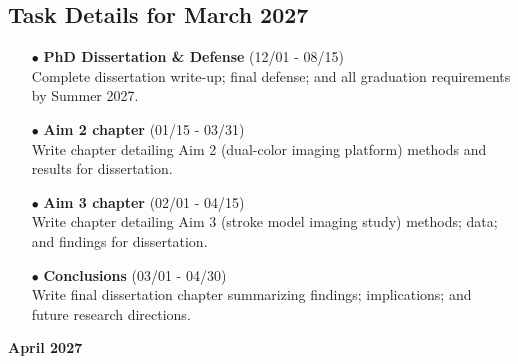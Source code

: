 \documentclass[landscape,a4paper]{article}
\begin{document}
\subsection{Task Details for March 2027}
\begin{itemize}[leftmargin=1cm]
    \item[\textcolor{other}{$\bullet$}] \textbf{PhD Dissertation \& Defense} (12/01 - 08/15)\\ Complete dissertation write-up; final defense; and all graduation requirements by Summer 2027.
    \item[\textcolor{other}{$\bullet$}] \textbf{Aim 2 chapter} (01/15 - 03/31)\\ Write chapter detailing Aim 2 (dual-color imaging platform) methods and results for dissertation.
    \item[\textcolor{other}{$\bullet$}] \textbf{Aim 3 chapter} (02/01 - 04/15)\\ Write chapter detailing Aim 3 (stroke model imaging study) methods; data; and findings for dissertation.
    \item[\textcolor{other}{$\bullet$}] \textbf{Conclusions} (03/01 - 04/30)\\ Write final dissertation chapter summarizing findings; implications; and future research directions.
\end{itemize}

\newpage
\pagestyle{empty}

\begin{center}
{\large\textbf{April 2027}}
\end{center}

\vspace{0.5cm}
\end{document}
